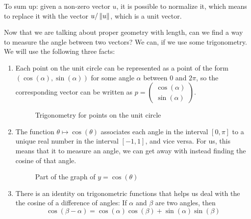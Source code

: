 \documentclass[00-livre-main.tex]{subfiles}
\begin{document}
To sum up: given a non-zero vector $u$, it is possible to normalize it, which means to replace it with the vector $u/\left\|u\right\|$, which is a unit vector.


Now that we are talking about proper geometry with length, can we find a way to measure the angle between two vectors? We can, if we use some trigonometry. We will use the following three facts:
\begin{enumerate}
\item Each point on the unit circle can be represented as a point of the form $(\cos(\alpha), \sin(\alpha))$ for some angle $\alpha$ between $0$ and $2\pi$, so the corresponding vector can be written as $p = \left(\begin{smallmatrix} \cos(\alpha) \\ \sin(\alpha) \end{smallmatrix}\right)$.


\begin{figure}[h]
\centering
{}
\caption{Trigonometry for points on the unit circle}
\label{fig:unit-circle}
\end{figure}


\item The function $\theta \mapsto \cos(\theta)$ associates each angle in the interval
$[0,\pi]$ to a unique real number in the interval $[-1,1]$, and vice versa. For us, this means that it to measure an angle, we can get away with instead finding the cosine of that angle.

\begin{figure}[h]
\centering
{}
\caption{Part of the graph of $y=\cos(\theta)$}
\label{fig:cos-graph}
\end{figure}

\item There is an identity on trigonometric functions that helps us deal with the the cosine of a difference of angles: If $\alpha$ and $\beta$ are two angles, then
\[
\cos(\beta-\alpha) = \cos(\alpha)\cos(\beta) + \sin(\alpha)\sin(\beta)
\]
\end{enumerate}
\end{document}
